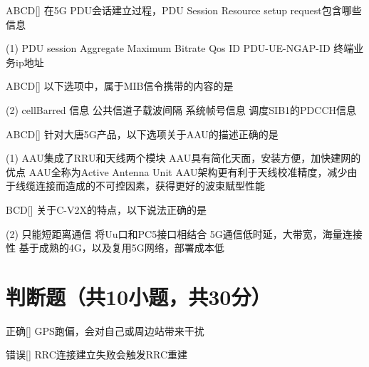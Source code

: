 \begin{choice}{\;ABCD\;}[]
    在5G PDU会话建立过程，PDU Session Resource setup request包含哪些信息
    \begin{tasks}(1)
        \task PDU session Aggregate Maximum Bitrate
        \task Qos ID
        \task PDU-UE-NGAP-ID
        \task 终端业务ip地址
    \end{tasks}
\end{choice}

\begin{choice}{\;ABCD\;}[]
    以下选项中，属于MIB信令携带的内容的是
    \begin{tasks}(2)
        \task cellBarred 信息
        \task 公共信道子载波间隔
        \task 系统帧号信息
        \task 调度SIB1的PDCCH信息
    \end{tasks}
\end{choice}

\begin{choice}{\;ABCD\;}[]
    针对大唐5G产品，以下选项关于AAU的描述正确的是
    \begin{tasks}(1)
        \task AAU集成了RRU和天线两个模块
        \task AAU具有简化天面，安装方便，加快建网的优点
        \task AAU全称为Active Antenna Unit
        \task AAU架构更有利于天线校准精度，减少由于线缆连接而造成的不可控因素，获得更好的波束赋型性能
    \end{tasks}
\end{choice}

\begin{choice}{\;BCD\;}[]
    关于C-V2X的特点，以下说法正确的是
    \begin{tasks}(2)
        \task 只能短距离通信
        \task 将Uu口和PC5接口相结合
        \task 5G通信低时延，大带宽，海量连接性
        \task 基于成熟的4G，以及复用5G网络，部署成本低
    \end{tasks}
\end{choice}




\section{判断题（共10小题，共30分）}

\begin{choice}{\;正确\;}[]
    GPS跑偏，会对自己或周边站带来干扰
\end{choice}


\begin{choice}{\;错误\;}[]
    RRC连接建立失败会触发RRC重建
\end{choice}

